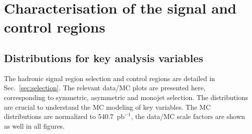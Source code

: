 \section{Characterisation of the signal and control regions}
\label{sec:yields}

\subsection{Distributions for key analysis variables \label{sec:mc-data-comp}}

The hadronic signal region selection and control regions are detailed in Sec.~\ref{sec:selection}. The relevant data/MC plots are presented here, corresponding to symmetric, asymmetric and monojet selection. The distributions are crucial to understand the MC modeling of key variables. The MC distributions are normalized to 540.7~$\text{pb}^{-1}$, the data/MC scale factors are shown as well in all figures.
